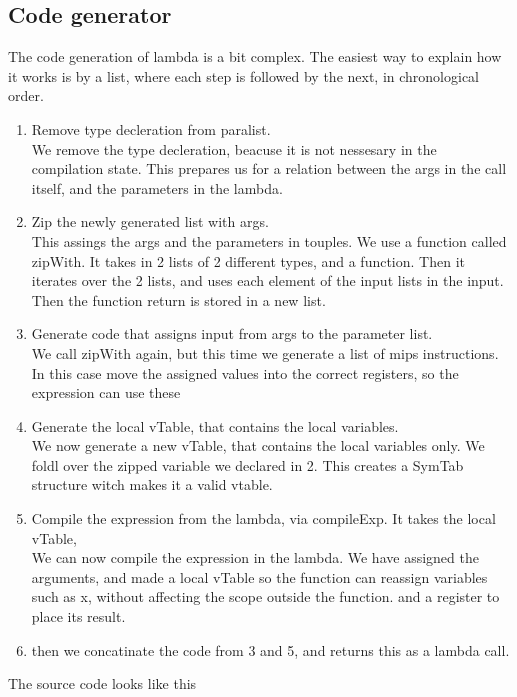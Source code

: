 \documentclass[11pt]{article}
\begin{document}
\subsection{Code generator}
The code generation of lambda is a bit complex. The easiest way to explain how it works
is by a list, where each step is followed by the next, in chronological order.
\begin{enumerate}
  \item Remove type decleration from paralist.\\
  We remove the type decleration, beacuse it is not nessesary in the compilation state. This
  prepares us for a relation between the args in the call itself, and the parameters in the 
  lambda.
  \item Zip the newly generated list with args.\\
  This assings the args and the parameters in touples. We use a function called zipWith.
  It takes in 2 lists of 2 different types, and a function. Then it iterates over the 2 lists,
  and uses each element of the input lists in the input. Then the function return is stored in
  a new list.  
  \item Generate code that assigns input from args to the parameter list.\\
  We call zipWith again, but this time we generate a list of mips instructions. In this case
  move the assigned values into the correct registers, so the expression can use these
  \item Generate the local vTable, that contains the local variables.\\
  We now generate a new vTable, that contains the local variables only. We foldl over the zipped
  variable we declared in 2. This creates a SymTab structure witch makes it a valid vtable.
  \item Compile the expression from the lambda, via compileExp. It takes the local vTable,\\
  We can now compile the expression in the lambda. We have assigned the arguments, and made a 
  local vTable so the function can reassign variables such as x, without affecting the scope 
  outside the function.
  and a register to place its result.
  \item then we concatinate the code from 3 and 5, and returns this as a lambda call.
\end{enumerate}
The source code looks like this
\end{document}
